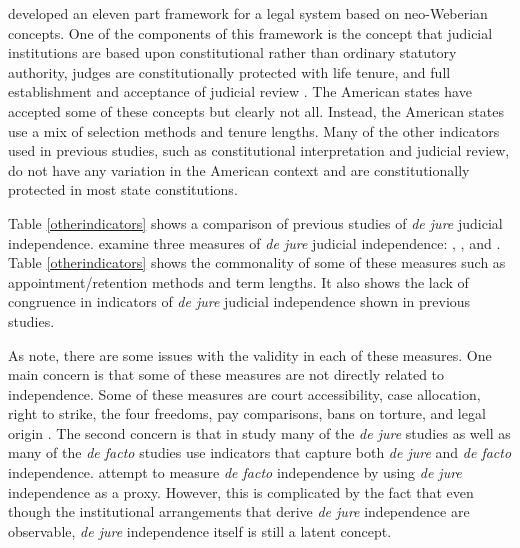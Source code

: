 \documentclass[12pt]{article}
\begin{document}
\citet{Schmidhauser1987} developed an eleven part framework for a legal system based on neo-Weberian concepts.  One of the components of this framework is the concept that judicial institutions are based upon constitutional rather than ordinary statutory authority,  judges are constitutionally protected with life tenure, and full establishment and acceptance of judicial review \citep[46-47]{Schmidhauser1987}.  The American states have accepted some of these concepts but clearly not all.  Instead, the American states use a mix of selection methods and tenure lengths.  Many of the other indicators used in previous studies, such as constitutional interpretation and judicial review, do not have any variation in the American context and are constitutionally protected in most state constitutions. 

Table \ref{otherindicators} shows a comparison of previous studies of \textit{de jure} judicial independence.  \citet{Rios2014} examine three measures of \textit{de jure} judicial independence: \citet{Feld2003}, \citet{Keith2002a}, and \citet{Laporta2004}.  Table \ref{otherindicators} shows the commonality of some of these measures such as appointment/retention methods and term lengths.  It also shows the lack of congruence in indicators of \textit{de jure} judicial independence shown in previous studies.

As \citet{Rios2014} note, there are some issues with the validity in each of these measures.  One main concern is that some of these measures are not directly related to independence.  Some of these measures are court accessibility, case allocation, right to strike, the four freedoms, pay comparisons, bans on torture, and legal origin \citep{Feld2003,Keith2002a,Laporta2004,Rios2014}.  The second concern is that in \citeauthor{Rios2014} study many of the \textit{de jure} studies as well as many of the \textit{de facto} studies use indicators that capture both \textit{de jure} and \textit{de facto} independence.  \citet{Laporta2004} attempt to measure \textit{de facto} independence by using \textit{de jure} independence as a proxy.  However, this is complicated by the fact that even though the institutional arrangements that derive \textit{de jure} independence are observable, \textit{de jure} independence itself is still a latent concept. 
\end{document}
